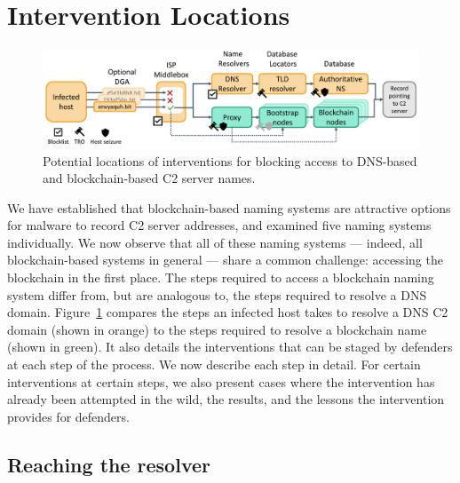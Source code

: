 \section{Intervention Locations}
\label{sec:accessing_records}

\begin{figure}[t]
	\centering
	\includegraphics[width=\textwidth]{figs/intervention_locations.pdf}
	\caption{Potential locations of interventions for 
	blocking access to DNS-based and blockchain-based C2 
	server names.}
	\label{fig:malware_contacting_cnc}
\end{figure}

We have established that blockchain-based naming systems are 
attractive options for malware to record C2 server addresses, 
and examined five naming systems individually. We now observe 
that all of these naming systems --- indeed, all 
blockchain-based systems in general --- share a 
common challenge: accessing the blockchain in the first 
place. The steps 
required to access a blockchain naming system differ from, 
but are analogous to, the steps required to resolve a DNS 
domain. Figure~\ref{fig:malware_contacting_cnc} compares the 
steps an infected host takes to resolve a DNS C2 domain 
(shown in orange) to 
the steps required to resolve a blockchain 
name (shown in green). It also details the interventions that 
can be staged by 
defenders at each step of the process. We now describe each 
step in detail. For certain interventions at certain steps, 
we also present cases where the intervention has already been 
attempted in the wild, the results, and the lessons the 
intervention provides for defenders. 

\subsection{Reaching the resolver}

